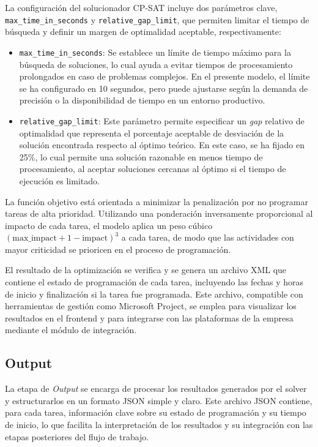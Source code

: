 \documentclass{article}
\begin{document}
La configuración del solucionador CP-SAT incluye dos parámetros clave, \texttt{max\_time\_in\_seconds} y \texttt{relative\_gap\_limit}, que permiten limitar el tiempo de búsqueda y definir un margen de optimalidad aceptable, respectivamente:

\begin{itemize}
    \item \texttt{max\_time\_in\_seconds}: Se establece un límite de tiempo máximo para la búsqueda de soluciones, lo cual ayuda a evitar tiempos de procesamiento prolongados en caso de problemas complejos. En el presente modelo, el límite se ha configurado en 10 segundos, pero puede ajustarse según la demanda de precisión o la disponibilidad de tiempo en un entorno productivo.

    \item \texttt{relative\_gap\_limit}: Este parámetro permite especificar un \textit{gap} relativo de optimalidad que representa el porcentaje aceptable de desviación de la solución encontrada respecto al óptimo teórico. En este caso, se ha fijado en 25\%, lo cual permite una solución razonable en menos tiempo de procesamiento, al aceptar soluciones cercanas al óptimo si el tiempo de ejecución es limitado.
\end{itemize}

La función objetivo está orientada a minimizar la penalización por no programar tareas de alta prioridad. Utilizando una ponderación inversamente proporcional al impacto de cada tarea, el modelo aplica un peso cúbico \((\text{max\_impact} + 1 - \text{impact})^3\) a cada tarea, de modo que las actividades con mayor criticidad se prioricen en el proceso de programación.

El resultado de la optimización se verifica y se genera un archivo XML que contiene el estado de programación de cada tarea, incluyendo las fechas y horas de inicio y finalización si la tarea fue programada. Este archivo, compatible con herramientas de gestión como Microsoft Project, se emplea para visualizar los resultados en el frontend y para integrarse con las plataformas de la empresa mediante el módulo de integración.

\subsection{Output}

La etapa de \textit{Output} se encarga de procesar los resultados generados por el solver y estructurarlos en un formato JSON simple y claro. Este archivo JSON contiene, para cada tarea, información clave sobre su estado de programación y su tiempo de inicio, lo que facilita la interpretación de los resultados y su integración con las etapas posteriores del flujo de trabajo.
\end{document}
